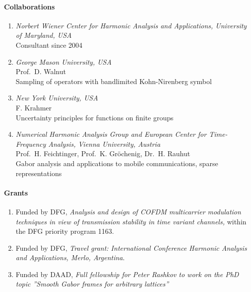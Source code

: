 \paragraph{Collaborations}
\begin{enumerate}


\item {\sl Norbert Wiener Center for Harmonic Analysis and
Applications, University of Maryland, USA}\\
Consultant since 2004

\item {\sl George Mason University, USA}\\ Prof.~D. Walnut\\
Sampling of operators with bandlimited Kohn-Nirenberg symbol

\item {\sl New York University, USA}\\ F. Krahmer\\
Uncertainty principles for functions on finite groups

\item {\sl Numerical Harmonic Analysis Group and European Center for
Time-Frequency Analysis, Vienna University, Austria}\\
Prof.~H. Feichtinger, Prof.~K. Gr\"ochenig, Dr.~H. Rauhut\\
Gabor analysis and applications to mobile communications, sparse
representations

\end{enumerate}



\paragraph{Grants}
\begin{enumerate}
\item Funded by DFG, \emph{Analysis and design of COFDM
multicarrier modulation techniques in view of transmission
stability in time variant channels,} within the DFG priority
program 1163.

\item  Funded by DFG, \emph{Travel grant: International Conference Harmonic Analysis and
    Applications, Merlo, Argentina}. 

\item  Funded by DAAD, \emph{Full fellowship for Peter Rashkov to work on the PhD topic
    ''Smooth Gabor frames for arbitrary lattices''}
\end{enumerate}



